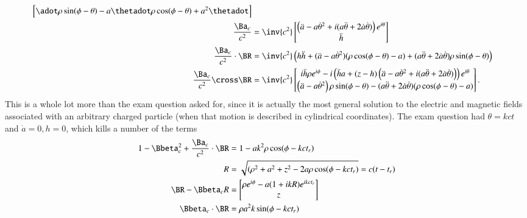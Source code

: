 {\begin{equation}
\begin{aligned}
\begin{bmatrix}
\adot \rho \sin(\phi - \theta) - a \thetadot \rho \cos(\phi - \theta) + a^2 \thetadot
\end{bmatrix} \\
\frac{\Ba_c}{c^2} &=
\inv{c^2}
\begin{bmatrix}
\left( \ddot{a} - a {\dot{\theta}}^2 + i ( a\ddot{\theta} + 2 \dot{a} \dot{\theta} ) \right) e^{i\theta} \\
\ddot{h}
\end{bmatrix} \\
\frac{\Ba_c}{c^2} \cdot \BR &=
\inv{c^2} \left(
h \ddot{h} +
( \ddot{a} - a {\dot{\theta}}^2 ) (\rho \cos(\phi - \theta) - a)
+ (a \ddot{\theta} + 2 \dot{a} \dot{\theta}) \rho \sin(\phi - \theta) \right) \\
\frac{\Ba_c}{c^2} \cross \BR
&=
\inv{c^2}
\begin{bmatrix}
i \ddot{h} \rho e^{i\phi}
- i \left( \ddot{h} a + (z - h) \left( \ddot{a} - a {\dot{\theta}}^2 + i ( a\ddot{\theta} + 2 \dot{a} \dot{\theta} ) \right) \right) e^{i\theta} \\
\left( \ddot{a} - a {\dot{\theta}}^2 \right) \rho \sin(\phi - \theta)
-( a\ddot{\theta} + 2 \dot{a} \dot{\theta} ) (\rho \cos(\phi -\theta) - a)
\end{bmatrix}.
\end{aligned}
\end{equation}
%
This is a whole lot more than the exam question asked for, since it is actually the most general solution to the electric and magnetic fields associated with an arbitrary charged particle (when that motion is described in cylindrical coordinates).  The exam question had \(\theta = k c t\) and \(\dot{a} = 0, h = 0\), which kills a number of the terms
%
\begin{equation}\label{eqn:relativisticElectrodynamicsExamReflection:1010}
\begin{aligned}
1 - \Bbeta_c^2 + \frac{\Ba_c}{c^2} \cdot \BR &= 1 - a k^2 \rho \cos(\phi -  k c t_r) \\
R &= \sqrt{(\rho^2 + a^2 + z^2 - 2 a \rho \cos(\phi - k c t_r)} = c( t - t_r) \\
\BR - \Bbeta_c R &=
\begin{bmatrix}
\rho e^{i\phi} - a (1 + i k R) e^{i k c t_r} \\
z
\end{bmatrix} \\
\Bbeta_c \cdot \BR &= \rho a^2 k \sin(\phi -  k c t_r) \\

\end{aligned}
\end{equation}}
